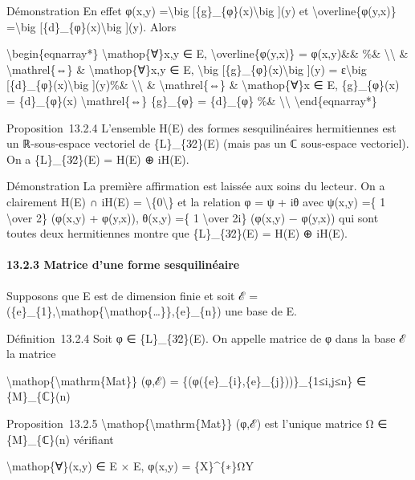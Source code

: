 \documentclass[]{article}
\begin{document}
Démonstration En effet φ(x,y) =\textbackslash{}big
{[}\{g\}\_\{φ\}(x)\textbackslash{}big {]}(y) et
\textbackslash{}overline\{φ(y,x)\} =\textbackslash{}big
{[}\{d\}\_\{φ\}(x)\textbackslash{}big {]}(y). Alors

\textbackslash{}begin\{eqnarray*\} \textbackslash{}mathop\{∀\}x,y ∈ E,
\textbackslash{}overline\{φ(y,x)\} = φ(x,y)\&\& \%\&
\textbackslash{}\textbackslash{} \& \textbackslash{}mathrel\{⇔\} \&
\textbackslash{}mathop\{∀\}x,y ∈ E, \textbackslash{}big
{[}\{g\}\_\{φ\}(x)\textbackslash{}big {]}(y) = ε\textbackslash{}big
{[}\{d\}\_\{φ\}(x)\textbackslash{}big {]}(y)\%\&
\textbackslash{}\textbackslash{} \& \textbackslash{}mathrel\{⇔\} \&
\textbackslash{}mathop\{∀\}x ∈ E, \{g\}\_\{φ\}(x) = \{d\}\_\{φ\}(x)
\textbackslash{}mathrel\{⇔\} \{g\}\_\{φ\} = \{d\}\_\{φ\} \%\&
\textbackslash{}\textbackslash{} \textbackslash{}end\{eqnarray*\}

Proposition~13.2.4 L'ensemble H(E) des formes sesquilinéaires
hermitiennes est un ℝ-sous-espace vectoriel de \{L\}\_\{3∕2\}(E) (mais
pas un ℂ sous-espace vectoriel). On a \{L\}\_\{3∕2\}(E) = H(E) ⊕ iH(E).

Démonstration La première affirmation est laissée aux soins du lecteur.
On a clairement H(E) ∩ iH(E) = \textbackslash{}\{0\textbackslash{}\} et
la relation φ = ψ + iθ avec ψ(x,y) =\{ 1 \textbackslash{}over 2\}
(φ(x,y) + φ(y,x)), θ(x,y) =\{ 1 \textbackslash{}over 2i\} (φ(x,y) −
φ(y,x)) qui sont toutes deux hermitiennes montre que \{L\}\_\{3∕2\}(E) =
H(E) ⊕ iH(E).

\paragraph{13.2.3 Matrice d'une forme sesquilinéaire}

Supposons que E est de dimension finie et soit ℰ =
(\{e\}\_\{1\},\textbackslash{}mathop\{\textbackslash{}mathop\{\ldots{}\}\},\{e\}\_\{n\})
une base de E.

Définition~13.2.4 Soit φ ∈ \{L\}\_\{3∕2\}(E). On appelle matrice de φ
dans la base ℰ la matrice

\textbackslash{}mathop\{\textbackslash{}mathrm\{Mat\}\} (φ,ℰ) =
\{(φ(\{e\}\_\{i\},\{e\}\_\{j\}))\}\_\{1≤i,j≤n\} ∈ \{M\}\_\{ℂ\}(n)

Proposition~13.2.5
\textbackslash{}mathop\{\textbackslash{}mathrm\{Mat\}\} (φ,ℰ) est
l'unique matrice Ω ∈ \{M\}\_\{ℂ\}(n) vérifiant

\textbackslash{}mathop\{∀\}(x,y) ∈ E × E, φ(x,y) = \{X\}\^{}\{∗\}ΩY
\end{document}
